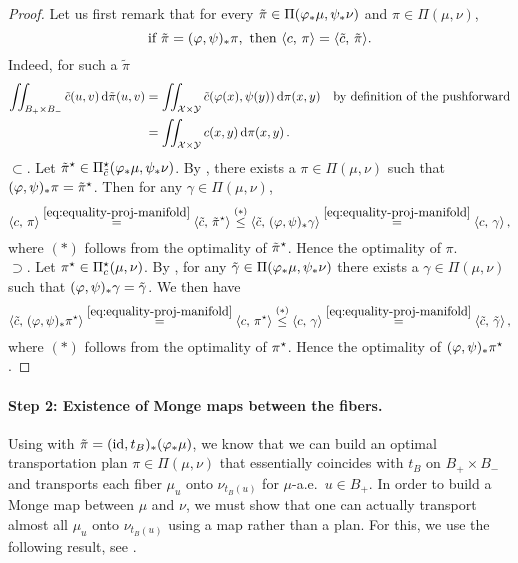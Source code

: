 \begin{proof}
Let us first remark that for every $\tilde\pi\in\Pi(\varphi_*\mu,\psi_*\nu)$ and $\pi\in\Pi(\mu,\nu)$,
\begin{equation}
    \label{eq:equality-proj-manifold}
    \text{if } \tilde\pi=(\varphi,\psi)_*\pi, \text{ then } \langle c,\,\pi\rangle=\langle \tilde c,\,\tilde\pi\rangle.
\end{equation}
Indeed, for such a $\tilde\pi$
\begin{align*}
    \iint_{ B_+\times B_-}\tilde c(u,v)\,\mathrm d \tilde\pi(u,v)&=\iint_{\mathcal{X} \times \mathcal{Y}}\tilde c(\varphi(x),\psi(y))\,\mathrm d \pi(x,y)&&\text{by definition of the pushforward}\\
    &=\iint_{\mathcal{X} \times \mathcal{Y}}c(x,y)\,\mathrm d \pi(x,y)\,.
\end{align*}
$\subset$.
Let $\tilde\pi^\star \in \Pi ^\star _{\tilde c}(\varphi_*\mu,\psi_*\nu)$. By , there exists a $\pi \in \Pi(\mu,\nu)$ such that $(\varphi,\psi)_*\pi=\tilde\pi^\star$. Then for any $\gamma \in \Pi(\mu,\nu)$, $$\langle c,\,\pi\rangle \stackrel{ \cref{eq:equality-proj-manifold} }{ = } \langle \tilde c,\,\tilde\pi\opt \rangle \stackrel{ (*) }{ \leq } \langle \tilde c,\,(\varphi,\psi)\push\gamma\rangle \stackrel{ \cref{eq:equality-proj-manifold} }{ = } \langle c,\,\gamma\rangle\,,$$ where $(*)$ follows from the optimality of $\tilde\pi^\star$. Hence the optimality of $\pi$.\\
$\supset$.
Let $\pi ^\star \in \Pi ^\star _{c}(\mu,\nu)$. By , for any $\tilde\gamma  \in \Pi  (\varphi_*\mu,\psi_*\nu)$ there exists a $\gamma \in \Pi(\mu,\nu)$ such that $(\varphi,\psi)_*\gamma=\tilde\gamma$. We then have $$\langle \tilde c,\,(\varphi,\psi)\push\pi \opt \rangle\stackrel{ \cref{eq:equality-proj-manifold} }{ = }\langle c,\,\pi \opt \rangle \stackrel{ (*) }{ \leq } \langle c,\,\gamma\rangle\stackrel{ \cref{eq:equality-proj-manifold} }{ = }\langle \tilde c,\,\tilde\gamma\rangle\,,$$ where $(*)$ follows from the optimality of $\pi^\star$. Hence the optimality of $(\varphi,\psi)_*\pi ^\star$.
\end{proof}

\paragraph{Step 2: Existence of Monge maps between the fibers.} Using  with $\tilde{\pi} = (\operatorname{id},t_B)_*(\varphi_*\mu)$, we know that we can build an optimal transportation plan $\pi \in \Pi(\mu,\nu)$ that essentially coincides with $t_B$ on $B_+ \times B_-$ and transports each fiber $\mu_u$ onto $\nu_{t_B(u)}$ for $\mu$-a.e.~$u \in B_+$.
In order to build a Monge map between $\mu$ and $\nu$, we must show that one can actually transport almost all $\mu_u$ onto $\nu_{t_B(u)}$ using a map rather than a plan.
For this, we use the following result, see \cite[Rem.~1.23, Lemma~1.28, Cor.~1.29]{santambrogio2015optimal}.

